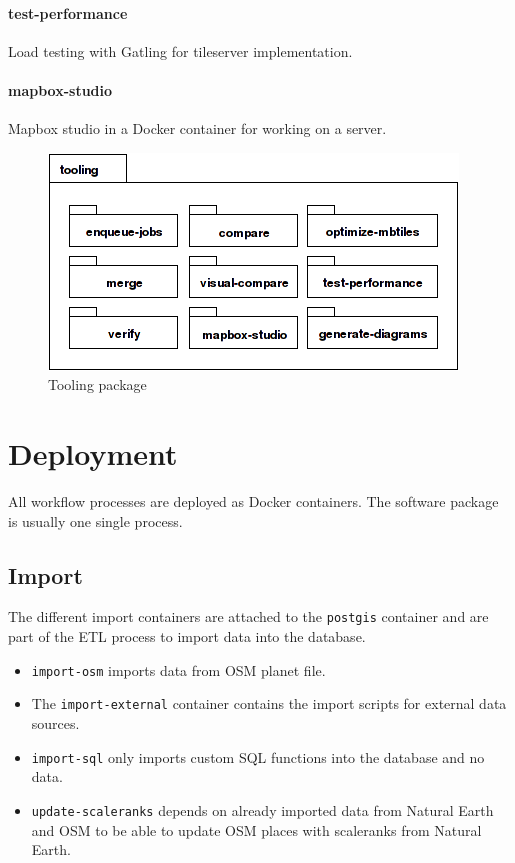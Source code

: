 \paragraph{test-performance}
Load testing with Gatling for tileserver implementation.

\paragraph{mapbox-studio}
Mapbox studio in a Docker container for working on a server.

\begin{figure}[H]
\centering
  \includegraphics[scale=0.6]{images/tooling_package_diagram.png}
  \caption{Tooling package}
\end{figure}

\newpage
\section{Deployment}\label{deployment}

All workflow processes are deployed as Docker containers. The software package
is usually one single process.

\subsection{Import}
The different import containers are attached to the \texttt{postgis} container and
are part of the ETL process to import data into the database.

\begin{itemize}
  \item \texttt{import-osm} imports data from OSM planet file.
  \item The \texttt{import-external} container contains the import scripts for external data sources.
  \item \texttt{import-sql} only imports custom SQL functions into the database and no data.
  \item \texttt{update-scaleranks} depends on already imported data from Natural Earth and OSM to be able to update OSM places with scaleranks from Natural Earth.
\end{itemize}

